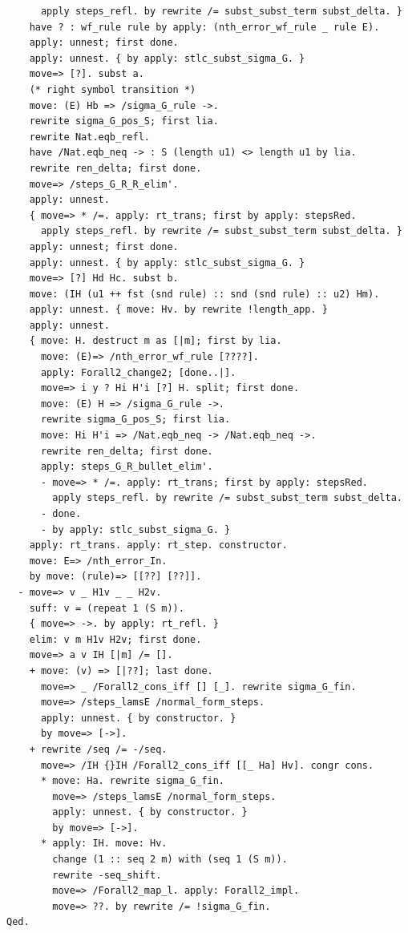 \begin{lstlisting}
      apply steps_refl. by rewrite /= subst_subst_term subst_delta. }
    have ? : wf_rule rule by apply: (nth_error_wf_rule _ rule E).
    apply: unnest; first done.
    apply: unnest. { by apply: stlc_subst_sigma_G. }
    move=> [?]. subst a.
    (* right symbol transition *)
    move: (E) Hb => /sigma_G_rule ->.
    rewrite sigma_G_pos_S; first lia.
    rewrite Nat.eqb_refl.
    have /Nat.eqb_neq -> : S (length u1) <> length u1 by lia.
    rewrite ren_delta; first done.
    move=> /steps_G_R_R_elim'.
    apply: unnest.
    { move=> * /=. apply: rt_trans; first by apply: stepsRed.
      apply steps_refl. by rewrite /= subst_subst_term subst_delta. }
    apply: unnest; first done.
    apply: unnest. { by apply: stlc_subst_sigma_G. }
    move=> [?] Hd Hc. subst b.
    move: (IH (u1 ++ fst (snd rule) :: snd (snd rule) :: u2) Hm).
    apply: unnest. { move: Hv. by rewrite !length_app. }
    apply: unnest.
    { move: H. destruct m as [|m]; first by lia.
      move: (E)=> /nth_error_wf_rule [????].
      apply: Forall2_change2; [done..|].
      move=> i y ? Hi H'i [?] H. split; first done.
      move: (E) H => /sigma_G_rule ->.
      rewrite sigma_G_pos_S; first lia.
      move: Hi H'i => /Nat.eqb_neq -> /Nat.eqb_neq ->.
      rewrite ren_delta; first done.
      apply: steps_G_R_bullet_elim'.
      - move=> * /=. apply: rt_trans; first by apply: stepsRed.
        apply steps_refl. by rewrite /= subst_subst_term subst_delta.
      - done.
      - by apply: stlc_subst_sigma_G. }
    apply: rt_trans. apply: rt_step. constructor.
    move: E=> /nth_error_In.
    by move: (rule)=> [[??] [??]].
  - move=> v _ H1v _ _ H2v.
    suff: v = (repeat 1 (S m)).
    { move=> ->. by apply: rt_refl. }
    elim: v m H1v H2v; first done.
    move=> a v IH [|m] /= [].
    + move: (v) => [|??]; last done.
      move=> _ /Forall2_cons_iff [] [_]. rewrite sigma_G_fin.
      move=> /steps_lamsE /normal_form_steps.
      apply: unnest. { by constructor. }
      by move=> [->].
    + rewrite /seq /= -/seq.
      move=> /IH {}IH /Forall2_cons_iff [[_ Ha] Hv]. congr cons.
      * move: Ha. rewrite sigma_G_fin.
        move=> /steps_lamsE /normal_form_steps.
        apply: unnest. { by constructor. }
        by move=> [->].
      * apply: IH. move: Hv.
        change (1 :: seq 2 m) with (seq 1 (S m)).
        rewrite -seq_shift.
        move=> /Forall2_map_l. apply: Forall2_impl.
        move=> ??. by rewrite /= !sigma_G_fin.
Qed.


\end{lstlisting}

